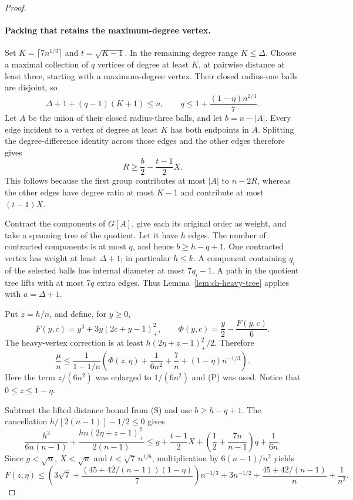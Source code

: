 \documentclass[11pt,a4paper]{article}
\theoremstyle{remark}
\numberwithin{equation}{section}
\begin{document}
\begin{proof}
\paragraph{Packing that retains the maximum-degree vertex.}
Set $K=\lceil7n^{1/3}\rceil$ and $t=\sqrt{K-1}$.
In the remaining degree range $K\le\Delta$. Choose a maximal collection
of $q$ vertices of degree at least $K$, at pairwise distance at least
three, starting with a maximum-degree vertex. Their closed radius-one
balls are disjoint, so
\[
 \Delta+1+(q-1)(K+1)\le n,
 \qquad
 q\le1+\frac{(1-\eta)n^{2/3}}7.\tag{P}
\]
Let $A$ be the union of their closed radius-three balls, and let
$b=n-|A|$. Every edge incident to a vertex of degree at least $K$ has
both endpoints in $A$. Splitting the degree-difference identity across
those edges and the other edges therefore gives
\[
 R\ge\frac b2-\frac{t-1}{2}X.\tag{S}
\]
This follows because the first group contributes at most $|A|$ to
$n-2R$, whereas the other edges have degree ratio at most $K-1$ and
contribute at most $(t-1)X$.

Contract the components of $G[A]$, give each its original order as weight,
and take a spanning tree of the quotient. Let it have $h$ edges. The
number of contracted components is at most $q$, and hence
$b\ge h-q+1$. One contracted vertex has weight at least $\Delta+1$;
in particular $h\le k$. A component containing $q_i$ of the selected
balls has internal diameter at most $7q_i-1$. A path in the quotient
tree lifts with at most $7q$ extra edges. Thus Lemma~\ref{lem:ch-heavy-tree}
applies with $a=\Delta+1$.

Put $z=h/n$, and define, for $y\ge0$,
\[
 F(y,c)=y^3+3y(2c+y-1)_+^2,
 \qquad \Phi(y,c)=\frac y2-\frac{F(y,c)}6.
\]
The heavy-vertex correction is at least
$h(2\eta+z-1)_+^2/2$. Therefore
\begin{equation}\label{eq:heavy-mu-upper}
 \frac\mu n\le\frac1{1-1/n}
 \left(\Phi(z,\eta)+\frac1{6n^2}+\frac7n
                  +(1-\eta)n^{-1/3}\right).
\end{equation}
Here the term $z/(6n^2)$ was enlarged to $1/(6n^2)$ and \textup{(P)}
was used. Notice that $0\le z\le1-\eta$.

Subtract the lifted distance bound from \textup{(S)} and use
$b\ge h-q+1$. The cancellation $h/[2(n-1)]-1/2\le0$ gives
\[
 \frac{h^3}{6n(n-1)}+
 \frac{h n(2\eta+z-1)_+^2}{2(n-1)}
 \le g+\frac{t-1}{2}X+
 \left(\frac12+\frac{7n}{n-1}\right)q+\frac1{6n}.
\]
Since $g<\sqrt n$, $X<\sqrt n$ and $t<\sqrt7\,n^{1/6}$,
multiplication by $6(n-1)/n^2$ yields
\begin{equation}\label{eq:heavy-cubic}
 F(z,\eta)\le
 \left(3\sqrt7+\frac{(45+42/(n-1))(1-\eta)}7\right)n^{-1/3}
 +3n^{-1/2}+\frac{45+42/(n-1)}n+\frac1{n^2}.
\end{equation}


\end{proof}
\end{document}
